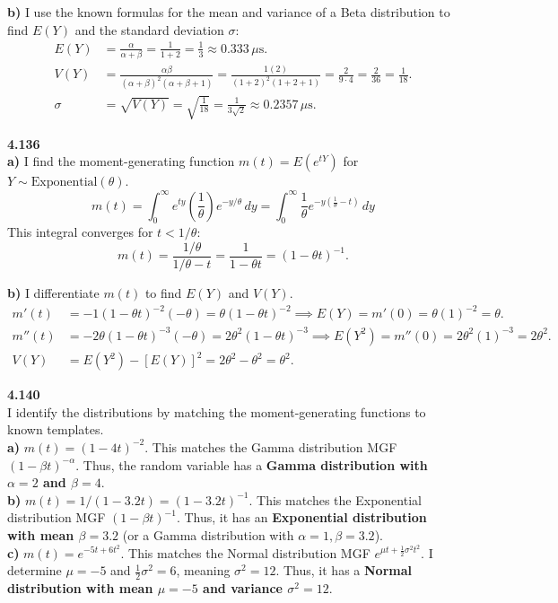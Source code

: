 \documentclass[12pt]{article}
\begin{document}
\vspace{0.2cm}
\noindent \textbf{b)} I use the known formulas for the mean and variance of a Beta distribution to find $E(Y)$ and the standard deviation $\sigma$:
\begin{align*}
E(Y) &= \frac{\alpha}{\alpha+\beta} = \frac{1}{1+2} = \frac{1}{3} \approx 0.333 \, \mu\text{s}. \\
V(Y) &= \frac{\alpha\beta}{(\alpha+\beta)^2(\alpha+\beta+1)} = \frac{1(2)}{(1+2)^2(1+2+1)} = \frac{2}{9 \cdot 4} = \frac{2}{36} = \frac{1}{18}. \\
\sigma &= \sqrt{V(Y)} = \sqrt{\frac{1}{18}} = \frac{1}{3\sqrt{2}} \approx 0.2357 \, \mu\text{s}.
\end{align*}

\vspace{0.5cm}

\noindent \textbf{4.136} \\
\textbf{a)} I find the moment-generating function $m(t) = E(e^{tY})$ for $Y \sim \text{Exponential}(\theta)$.
\[ m(t) = \int_0^\infty e^{ty} \left(\frac{1}{\theta}\right) e^{-y/\theta} \, dy = \int_0^\infty \frac{1}{\theta} e^{-y\left(\frac{1}{\theta} - t\right)} \, dy \]
This integral converges for $t < 1/\theta$:
\[ m(t) = \frac{1/\theta}{1/\theta - t} = \frac{1}{1-\theta t} = (1-\theta t)^{-1}. \]

\vspace{0.2cm}
\noindent \textbf{b)} I differentiate $m(t)$ to find $E(Y)$ and $V(Y)$.
\begin{align*}
m'(t) &= -1(1-\theta t)^{-2}(-\theta) = \theta(1-\theta t)^{-2} \implies E(Y) = m'(0) = \theta(1)^{-2} = \theta. \\
m''(t) &= -2\theta(1-\theta t)^{-3}(-\theta) = 2\theta^2(1-\theta t)^{-3} \implies E(Y^2) = m''(0) = 2\theta^2(1)^{-3} = 2\theta^2. \\
V(Y) &= E(Y^2) - [E(Y)]^2 = 2\theta^2 - \theta^2 = \theta^2.
\end{align*}

\vspace{0.5cm}

\noindent \textbf{4.140} \\
I identify the distributions by matching the moment-generating functions to known templates. \\
\textbf{a)} $m(t) = (1-4t)^{-2}$. This matches the Gamma distribution MGF $(1-\beta t)^{-\alpha}$. Thus, the random variable has a \textbf{Gamma distribution with $\alpha = 2$ and $\beta = 4$}. \\
\textbf{b)} $m(t) = 1/(1-3.2t) = (1-3.2t)^{-1}$. This matches the Exponential distribution MGF $(1-\beta t)^{-1}$. Thus, it has an \textbf{Exponential distribution with mean $\beta = 3.2$} (or a Gamma distribution with $\alpha=1, \beta=3.2$). \\
\textbf{c)} $m(t) = e^{-5t+6t^2}$. This matches the Normal distribution MGF $e^{\mu t + \frac{1}{2}\sigma^2t^2}$. I determine $\mu = -5$ and $\frac{1}{2}\sigma^2 = 6$, meaning $\sigma^2 = 12$. Thus, it has a \textbf{Normal distribution with mean $\mu = -5$ and variance $\sigma^2 = 12$}.
\end{document}
